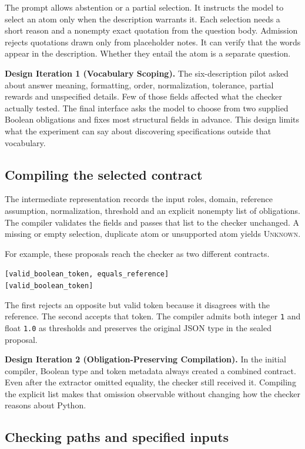 \documentclass[sigconf]{acmart}
\newcommand{\Unknown}{\textsc{Unknown}}
\begin{document}
The prompt allows abstention or a partial selection. It instructs the model to select an atom only when the description warrants it. Each selection needs a short reason and a nonempty exact quotation from the question body. Admission rejects quotations drawn only from placeholder notes. It can verify that the words appear in the description. Whether they entail the atom is a separate question.

\textbf{Design Iteration 1 (Vocabulary Scoping).} The six-description pilot asked about answer meaning, formatting, order, normalization, tolerance, partial rewards and unspecified details. Few of those fields affected what the checker actually tested. The final interface asks the model to choose from two supplied Boolean obligations and fixes most structural fields in advance. This design limits what the experiment can say about discovering specifications outside that vocabulary.

\subsection{Compiling the selected contract}

The intermediate representation records the input roles, domain, reference assumption, normalization, threshold and an explicit nonempty list of obligations. The compiler validates the fields and passes that list to the checker unchanged. A missing or empty selection, duplicate atom or unsupported atom yields \Unknown{}.

For example, these proposals reach the checker as two different contracts.
\begin{center}
\texttt{[valid\_boolean\_token, equals\_reference]}\\
\texttt{[valid\_boolean\_token]}
\end{center}
The first rejects an opposite but valid token because it disagrees with the reference. The second accepts that token. The compiler admits both integer \texttt{1} and float \texttt{1.0} as thresholds and preserves the original JSON type in the sealed proposal.

\textbf{Design Iteration 2 (Obligation-Preserving Compilation).} In the initial compiler, Boolean type and token metadata always created a combined contract. Even after the extractor omitted equality, the checker still received it. Compiling the explicit list makes that omission observable without changing how the checker reasons about Python.

\subsection{Checking paths and specified inputs}
\end{document}
